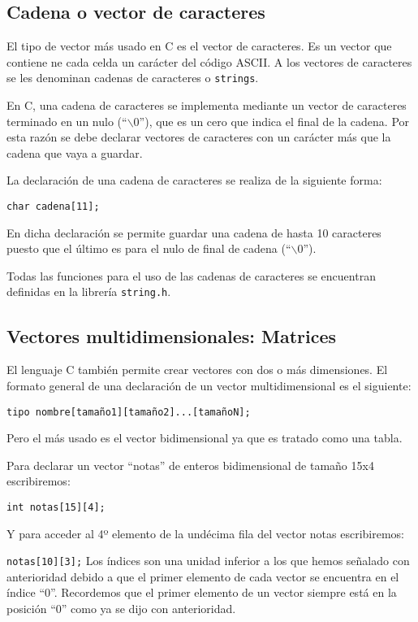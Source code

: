\subsection{Cadena o vector de caracteres}{
El tipo de vector más usado en C es el vector de caracteres. Es un vector que contiene ne cada celda un carácter del código ASCII. A los vectores de caracteres se les denominan cadenas de caracteres o \texttt{strings}.

En C, una cadena de caracteres se implementa mediante un vector de caracteres terminado en un nulo (``$\backslash{0}$''), que es un cero que indica el final de la cadena. Por esta razón se debe declarar vectores de caracteres con un carácter más que la cadena que vaya a guardar.

La declaración de una cadena de caracteres se realiza de la siguiente forma:

\texttt{char cadena[11];}

En dicha declaración se permite guardar una cadena de hasta 10 caracteres puesto que el último es para el nulo de final de cadena (``$\backslash{0}$'').

Todas las funciones para el uso de las cadenas de caracteres se encuentran definidas en la librería \texttt{string.h}.
}
\subsection{Vectores multidimensionales: Matrices}{
El lenguaje C también permite crear vectores con dos o más dimensiones. El formato general de una declaración de un vector multidimensional es el siguiente:

\texttt{tipo nombre[tamaño1][tamaño2]...[tamañoN];}

Pero el más usado es el vector bidimensional ya que es tratado como una tabla.
\begin{Ejemplo}
Para declarar un vector ``notas'' de enteros bidimensional de tamaño 15x4 escribiremos:

\texttt{int notas[15][4];}

Y para acceder al 4º elemento de la undécima fila del vector notas escribiremos:

\texttt{notas[10][3];}
\Nota
Los índices son una unidad inferior a los que hemos señalado con anterioridad debido a que el primer elemento de cada vector se encuentra en el índice ``0''. Recordemos que el primer elemento de un vector siempre está en la posición ``0'' como ya se dijo con anterioridad.
\end{Ejemplo}
}
